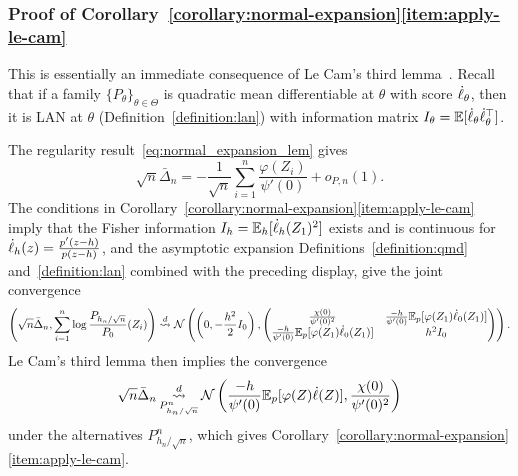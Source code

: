 \subsubsection*{Proof of
  Corollary~\ref{corollary:normal-expansion}\eqref{item:apply-le-cam}}

This is essentially an immediate consequence of Le Cam's third
lemma~\cite[Example 6.7]{VanDerVaart98}.
Recall~\cite[Thm.~7.2]{VanDerVaart98} that if
a family $\{P_\theta\}_{\theta \in \Theta}$ is quadratic mean differentiable
at $\theta$ with score $\dot{\ell}_\theta$, then
it is LAN at $\theta$ (Definition~\ref{definition:lan})
with information matrix $I_\theta = \mathbb{E}[\dot{\ell}_\theta \dot{\ell}_\theta^\top]$.




The regularity result~\eqref{eq:normal_expansion_lem} gives
\begin{equation*}
  \sqrt{n} \bar{\Delta}_n = -\frac{1}{\sqrt{n}}
  \sum_{i = 1}^n  \frac{\varphi(Z_i)}{\psi'(0)} + o_{P,n}(1).
\end{equation*}
The conditions in
Corollary~\ref{corollary:normal-expansion}\eqref{item:apply-le-cam} imply
that the Fisher information $I_h =
\mathbb{E}_h[\dot{\ell}_h(Z_1)^2]$ exists and is continuous for
$\dot{\ell}_h(z) = \frac{p'(z - h)}{p(z - h)}$,
and the asymptotic expansion Definitions~\ref{definition:qmd}
and~\ref{definition:lan} combined
with the preceding display, give the joint convergence
\begin{equation*}
  \left(\sqrt{n} \bar{\Delta}_n, \sum_{i=1}^n \log \frac{P_{h_n/\sqrt{n}}}{P_0}(Z_i)
  \right)
  \stackrel{d}{\rightsquigarrow} \mathcal{N} \left( \left(0,-\frac{h^2}{2} I_0 \right),
  \begin{pmatrix}
    \frac{\chi(0)}{\psi'(0)^2} & \frac{-h}{ \psi'(0)}
    \mathbb{E}_p[\varphi(Z_1) \dot{\ell}_0(Z_1)] \\
    \frac{-h}{ \psi'(0)} \mathbb{E}_p[\varphi(Z_1) \dot{\ell}_0(Z_1)]
    & h^2 I_0
  \end{pmatrix}  \right).
\end{equation*}
Le Cam's third lemma \cite[Exm. 6.7]{VanDerVaart98} then implies the
convergence
\begin{equation*}
  \sqrt{n}\bar{\Delta}_n
  \mathop{\stackrel{d}{\rightsquigarrow}}_{P_{h_n/\sqrt{n}}^n}
  \mathcal{N}\left(\frac{-h}{ \psi'(0)} \mathbb{E}_p[\varphi(Z) \dot{\ell}(Z)],
  \frac{\chi(0)}{\psi'(0)^2} \right)
\end{equation*}
under the alternatives $P^n_{h_n/\sqrt{n}}$, which gives
Corollary~\ref{corollary:normal-expansion}\eqref{item:apply-le-cam}.

